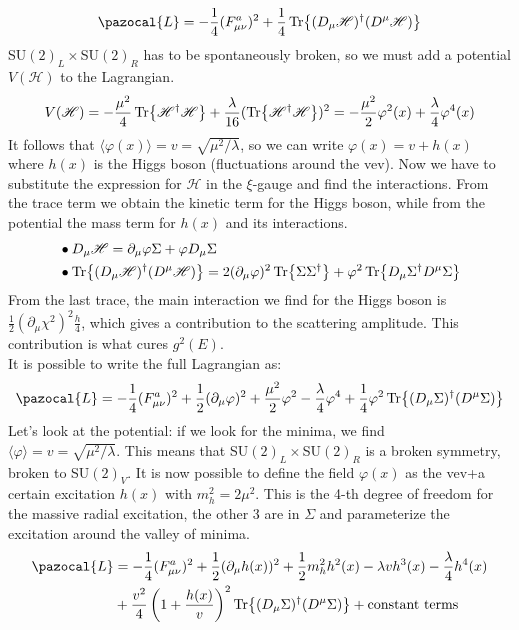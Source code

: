 \documentclass[../main.tex]{subfiles}
\begin{document}
\[
\pazocal{L}=-\frac{1}{4}(F_{\mu\nu}^a)^2+\frac{1}{4}\Tr{(D_\mu\mathcal{H})^\dagger(D^\mu\mathcal{H})}
\]
SU$(2)_L\times$SU$(2)_R$ has to be spontaneously broken, so we must add a potential $V(\mathcal{H})$ to the Lagrangian.
\[
V(\mathcal{H})=-\frac{\mu^2}{4}\Tr{\mathcal{H}^\dagger\mathcal{H}}+\frac{\lambda}{16}(\Tr{\mathcal{H}^\dagger\mathcal{H}})^2=-\frac{\mu^2}{2}\varphi^2(x)+\frac{\lambda}{4}\varphi^4(x)
\]
It follows that $\langle\varphi(x)\rangle=v=\sqrt{\mu^2/\lambda}$, so we can write $\varphi(x)=v+h(x)$ where $h(x)$ is the Higgs boson (fluctuations around the vev). Now we have to substitute the expression for $\mathcal{H}$ in the $\xi$-gauge and find the interactions. From the trace term we obtain the kinetic term for the Higgs boson, while from the potential the mass term for $h(x)$ and its interactions.
\begin{align*}
&\bullet D_\mu\mathcal{H}=\partial_\mu\varphi\Sigma+\varphi D_\mu\Sigma\\
&\bullet \Tr{(D_\mu\mathcal{H})^\dagger(D^\mu\mathcal{H})}=2(\partial_\mu\varphi)^2\Tr{\Sigma\Sigma^\dagger}+\varphi^2\Tr{D_\mu\Sigma^\dagger D^\mu\Sigma}
\end{align*}
From the last trace, the main interaction we find for the Higgs boson is $\frac{1}{2}(\partial_\mu\chi^2)^2\frac{h}{4}$, which gives a contribution to the scattering amplitude. This contribution is what cures $g^2(E)$.\\
It is possible to write the full Lagrangian as:
\[
\pazocal{L}=-\frac{1}{4}(F_{\mu\nu}^a)^2+\frac{1}{2}(\partial_\mu\varphi)^2+\frac{\mu^2}{2}\varphi^2-\frac{\lambda}{4}\varphi^4+\frac{1}{4}\varphi^2\Tr{(D_\mu\Sigma)^\dagger(D^\mu\Sigma)}
\]
Let's look at the potential: if we look for the minima, we find\\
$\langle\varphi\rangle=v=\sqrt{\mu^2/\lambda}$. This means that SU$(2)_L\times$SU$(2)_R$ is a broken symmetry, broken to SU$(2)_V$. It is now possible to define the field $\varphi(x)$ as the vev+a certain excitation $h(x)$ with $m_h^2=2\mu^2$. This is the 4-th degree of freedom for the massive radial excitation, the other 3 are in $\Sigma$ and parameterize the excitation around the valley of minima.
\begin{align*}
\pazocal{L}&=-\frac{1}{4}(F_{\mu\nu}^a)^2+\frac{1}{2}(\partial_\mu h(x))^2+\frac{1}{2}m_h^2h^2(x)-\lambda vh^3(x)-\frac{\lambda}{4}h^4(x)\\
&+\frac{v^2}{4}\left(1+\frac{h(x)}{v}\right)^2\Tr{(D_\mu\Sigma)^\dagger(D^\mu\Sigma)}+\text{constant terms}
\end{align*}
\end{document}
